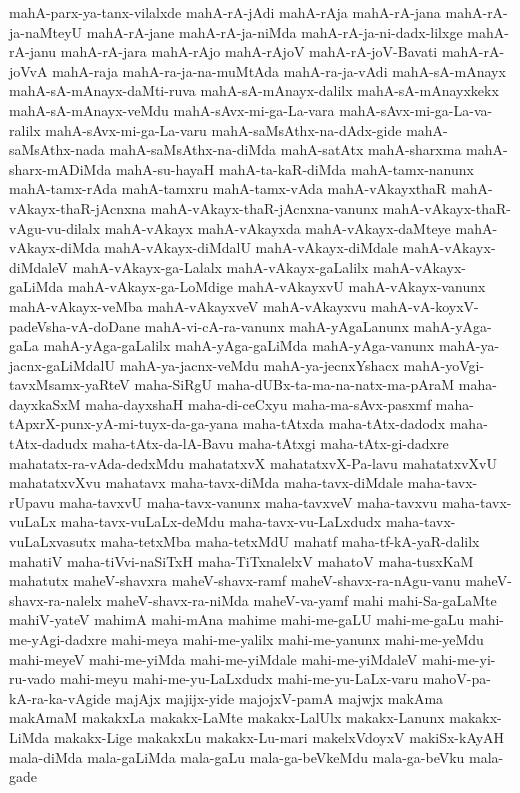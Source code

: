 {mahA-parx-ya-tanx-vilalxde
mahA-rA-jAdi
mahA-rAja
mahA-rA-jana
mahA-rA-ja-naMteyU
mahA-rA-jane
mahA-rA-ja-niMda
mahA-rA-ja-ni-dadx-lilxge
mahA-rA-janu
mahA-rA-jara
mahA-rAjo
mahA-rAjoV
mahA-rA-joV-Bavati
mahA-rA-joVvA
mahA-raja
mahA-ra-ja-na-muMtAda
mahA-ra-ja-vAdi
mahA-sA-mAnayx
mahA-sA-mAnayx-daMti-ruva
mahA-sA-mAnayx-dalilx
mahA-sA-mAnayxkekx
mahA-sA-mAnayx-veMdu
mahA-sAvx-mi-ga-La-vara
mahA-sAvx-mi-ga-La-va-ralilx
mahA-sAvx-mi-ga-La-varu
mahA-saMsAthx-na-dAdx-gide
mahA-saMsAthx-nada
mahA-saMsAthx-na-diMda
mahA-satAtx
mahA-sharxma
mahA-sharx-mADiMda
mahA-su-hayaH
mahA-ta-kaR-diMda
mahA-tamx-nanunx
mahA-tamx-rAda
mahA-tamxru
mahA-tamx-vAda
mahA-vAkayxthaR
mahA-vAkayx-thaR-jAcnxna
mahA-vAkayx-thaR-jAcnxna-vanunx
mahA-vAkayx-thaR-vAgu-vu-dilalx
mahA-vAkayx
mahA-vAkayxda
mahA-vAkayx-daMteye
mahA-vAkayx-diMda
mahA-vAkayx-diMdalU
mahA-vAkayx-diMdale
mahA-vAkayx-diMdaleV
mahA-vAkayx-ga-Lalalx
mahA-vAkayx-gaLalilx
mahA-vAkayx-gaLiMda
mahA-vAkayx-ga-LoMdige
mahA-vAkayxvU
mahA-vAkayx-vanunx
mahA-vAkayx-veMba
mahA-vAkayxveV
mahA-vAkayxvu
mahA-vA-koyxV-padeVsha-vA-doDane
mahA-vi-cA-ra-vanunx
mahA-yAgaLanunx
mahA-yAga-gaLa
mahA-yAga-gaLalilx
mahA-yAga-gaLiMda
mahA-yAga-vanunx
mahA-ya-jacnx-gaLiMdalU
mahA-ya-jacnx-veMdu
mahA-ya-jecnxYshacx
mahA-yoVgi-tavxMsamx-yaRteV
maha-SiRgU
maha-dUBx-ta-ma-na-natx-ma-pAraM
maha-dayxkaSxM
maha-dayxshaH
maha-di-ceCxyu
maha-ma-sAvx-pasxmf
maha-tApxrX-punx-yA-mi-tuyx-da-ga-yana
maha-tAtxda
maha-tAtx-dadodx
maha-tAtx-dadudx
maha-tAtx-da-lA-Bavu
maha-tAtxgi
maha-tAtx-gi-dadxre
mahatatx-ra-vAda-dedxMdu
mahatatxvX
mahatatxvX-Pa-lavu
mahatatxvXvU
mahatatxvXvu
mahatavx
maha-tavx-diMda
maha-tavx-diMdale
maha-tavx-rUpavu
maha-tavxvU
maha-tavx-vanunx
maha-tavxveV
maha-tavxvu
maha-tavx-vuLaLx
maha-tavx-vuLaLx-deMdu
maha-tavx-vu-LaLxdudx
maha-tavx-vuLaLxvasutx
maha-tetxMba
maha-tetxMdU
mahatf
maha-tf-kA-yaR-dalilx
mahatiV
maha-tiVvi-naSiTxH
maha-TiTxnalelxV
mahatoV
maha-tusxKaM
mahatutx
maheV-shavxra
maheV-shavx-ramf
maheV-shavx-ra-nAgu-vanu
maheV-shavx-ra-nalelx
maheV-shavx-ra-niMda
maheV-va-yamf
mahi
mahi-Sa-gaLaMte
mahiV-yateV
mahimA
mahi-mAna
mahime
mahi-me-gaLU
mahi-me-gaLu
mahi-me-yAgi-dadxre
mahi-meya
mahi-me-yalilx
mahi-me-yanunx
mahi-me-yeMdu
mahi-meyeV
mahi-me-yiMda
mahi-me-yiMdale
mahi-me-yiMdaleV
mahi-me-yi-ru-vado
mahi-meyu
mahi-me-yu-LaLxdudx
mahi-me-yu-LaLx-varu
mahoV-pa-kA-ra-ka-vAgide
majAjx
majijx-yide
majojxV-pamA
majwjx
makAma
makAmaM
makakxLa
makakx-LaMte
makakx-LalUlx
makakx-Lanunx
makakx-LiMda
makakx-Lige
makakxLu
makakx-Lu-mari
makelxVdoyxV
makiSx-kAyAH
mala-diMda
mala-gaLiMda
mala-gaLu
mala-ga-beVkeMdu
mala-ga-beVku
mala-gade
}
